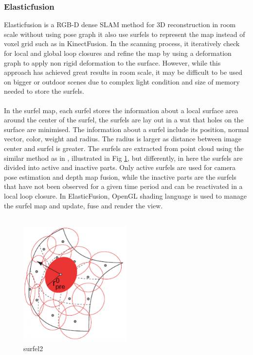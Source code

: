 \documentclass[12pt,twoside]{article}
\begin{document}
\subsubsection{Elasticfusion}
Elasticfusion\cite{whelan2016elasticfusion} is a RGB-D dense SLAM method for 3D reconstruction in room scale without using pose graph  it also use surfels to represent the map instead of voxel grid such as in KinectFusion\cite{newcombe2011kinectfusion}. In the scanning process, it iteratively check for local and global loop closures and refine the map by using a deformation graph to apply non rigid deformation to the surface. However, while this approach has achieved great results in room scale, it may be difficult to be used on bigger or outdoor scenes due to complex light condition and size of memory needed to store the surfels.\\
\\
In the surfel map, each surfel stores the information about a local surface area around the center of the surfel, the surfels are lay out in a wat that holes on the surface are minimised. The information about a surfel include its position, normal vector, color, weight and radius. The radius is larger as distance between image center and surfel is greater. The surfels are extracted from point cloud using the similar method as in \citep{keller2013real}, illustrated in Fig \ref{fig:surfel2}, but differently, in here the surfels are divided into active and inactive parts. Only active surfels are used for camera pose estimation and depth map fusion, while the inactive parts are the surfels that have not been observed for a given time period and can be reactivated in a local loop closure. In ElasticFusion, OpenGL shading language is used to manage the surfel map and update, fuse and render the view. \\
\\
\begin{figure}[h]
    \centering
    \includegraphics[width=0.5\textwidth]{figures/surfel2}
    \caption{surfel2}
    \label{fig:surfel2}
\end{figure}
\end{document}
